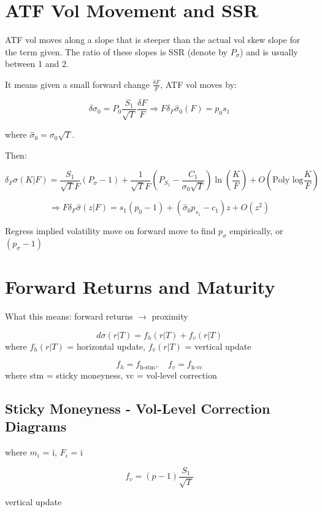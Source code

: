 \documentclass[12pt]{article}
\begin{document}
\section{ATF Vol Movement and SSR}

ATF vol moves along a slope that is steeper than the actual vol skew slope for the term given. The ratio of these slopes is SSR (denote by $P_\sigma$) and is usually between 1 and 2.

It means given a small forward change $\frac{\delta F}{F}$, ATF vol moves by:

\[
\delta \sigma_0 = P_0 \frac{S_1}{\sqrt{T}} \frac{\delta F}{F} \Rightarrow F \delta_F \hat{\sigma}_0(F) = p_0 s_1
\]

where $\hat{\sigma}_0 = \sigma_0 \sqrt{T}$.

Then:

\[
\delta_F \sigma(K|F) = \frac{S_1}{\sqrt{T}F} \left(P_\sigma - 1\right) + \frac{1}{\sqrt{T}F} \left(P_{S_1} - \frac{C_1}{\sigma_0\sqrt{T}}\right) \ln\left(\frac{K}{F}\right) + O(\text{Poly log}\frac{K}{F})
\]

\[
\Rightarrow F \delta_F \hat{\sigma} (z|F) = s_1(p_0 - 1) + \left(\hat{\sigma}_0 p_{s_1} - c_1\right) z + O(z^2)
\]

Regress implied volatility move on forward move to find $p_\sigma$ empirically, or $(p_\sigma - 1)$

\section{Forward Returns and Maturity}

What this means: forward returns $\rightarrow$ proximity

\[
d\sigma(r|T) = f_h(r|T) + f_v(r|T)
\]
where $f_h(r|T)$ = horizontal update, $f_v(r|T)$ = vertical update


\[
f_h = f_{\text{h-stm}}, \quad f_v = f_{\text{h-vc}}
\]
where stm = sticky moneyness, vc = vol-level correction

\subsection{Sticky Moneyness - Vol-Level Correction Diagrams}

\vspace{15em}


where $m_i$ =  i, $F_i$ =  i

\[
f_v = (p-1) \frac{S_1}{\sqrt{T}}
\]

vertical update
\vspace{15em}
\end{document}

